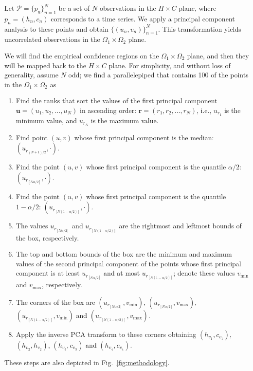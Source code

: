 Let $ {\mathcal P} = \{p_n \}_{n = 1}^{N} $ be a set of $N$ observations in the $H \times C$ plane, where ${p_n} = (h_n, c_n)$ corresponds to a time series.
We apply a principal component analysis to these points and obtain $\{(u_n,v_n)\}_{n=1}^N$.
This transformation yields uncorrelated observations in the $\Omega_1\times\Omega_2$ plane.

We will find the empirical confidence regions on the $\Omega_1\times\Omega_2$ plane, and then they will be mapped back to the $H \times C$ plane.
For simplicity, and without loss of generality, assume $N$ odd; we find a parallelepiped that contains 
\SI{100}{\minusalphapercent} of the points in the $\Omega_1\times\Omega_2$ as
\begin{enumerate}
    \item Find the ranks that sort the values of the first principal component $\bm u=(u_1,u_2,\dots,u_N)$ in ascending order: $\bm r=(r_1,r_2,\dots,r_N)$, i.e., $u_{r_1}$ is the minimum value, and $u_{r_N}$ is the maximum value.
    \item Find point $(u,v)$ whose first principal component is the median: $(u_{r_{(N+1)/2}}, \cdot)$.
    \item Find the point $(u,v)$ whose first principal component is the quantile $\alpha/2$: $(u_{r_{[N\alpha/2]}}, \cdot)$.
    \item Find the point $(u,v)$ whose first principal component is the quantile $1-\alpha/2$: $(u_{r_{[N(1-\alpha/2)]}}, \cdot)$.
    \item The values $u_{r_{[N\alpha/2]}}$ and $u_{r_{[N(1-\alpha/2)]}}$ are the rightmost and leftmost bounds of the box, respectively.
    \item The top and bottom bounds of the box are the minimum and maximum values of the second principal component of the points whose first principal component is at least $u_{r_{[N\alpha/2]}}$ and at most $u_{r_{[N(1-\alpha/2)]}}$; denote these values $v_{\min}$ and $v_{\max}$, respectively.
    \item The corners of the box are 
    $(u_{r_{[N\alpha/2]}}, v_{\min})$, 
    $(u_{r_{[N\alpha/2]}}, v_{\max})$, 
    $(u_{r_{[N(1-\alpha/2)]}}, v_{\min})$ and 
    $(u_{r_{[N(1-\alpha/2)]}},v_{\max})$.
    \item Apply the inverse PCA transform to these corners obtaining $(h_{v_1}, c_{v_1})$, $(h_{v_2}, h_{v_2})$, $(h_{v_3}, c_{v_3})$ and $(h_{v_4},c_{v_4})$.
\end{enumerate}
These steps are also depicted in Fig.~\ref{fig:methodology}.

